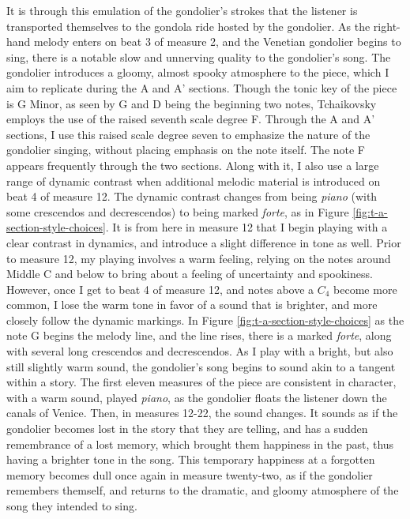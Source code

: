 It is through this emulation of the gondolier's strokes that the listener is transported themselves to the gondola ride hosted by the gondolier. As the right-hand melody enters on beat 3 of measure 2, and the Venetian gondolier begins to sing, there is a notable slow and unnerving quality to the gondolier's song. The gondolier introduces a gloomy, almost spooky atmosphere to the piece, which I aim to replicate during the A and A' sections. Though the tonic key of the piece is G Minor, as seen by G and D being the beginning two notes, Tchaikovsky employs the use of the raised seventh scale degree F\musSharp{}. Through the A and A' sections, I use this raised scale degree seven to emphasize the nature of the gondolier singing, without placing emphasis on the note itself. The note F\musSharp{} appears frequently through the two sections. Along with it, I also use a large range of dynamic contrast when additional melodic material is introduced on beat 4 of measure 12. The dynamic contrast changes from being \textit{piano} (with some crescendos and decrescendos) to being marked \textit{forte}, as in Figure \ref{fig:t-a-section-style-choices}\autocite{Henle_2002}. It is from here in measure 12 that I begin playing with a clear contrast in dynamics, and introduce a slight difference in tone as well. Prior to measure 12, my playing involves a warm feeling, relying on the notes around Middle C and below to bring about a feeling of uncertainty and spookiness. However, once I get to beat 4 of measure 12, and notes above a $C_4$ become more common, I lose the warm tone in favor of a sound that is brighter, and more closely follow the dynamic markings. In Figure \ref{fig:t-a-section-style-choices}\autocite{Henle_2002} as the note G begins the melody line, and the line rises, there is a marked \textit{forte}, along with several long crescendos and decrescendos. As I play with a bright, but also still slightly warm sound, the gondolier's song begins to sound akin to a tangent within a story. The first eleven measures of the piece are consistent in character, with a warm sound, played \textit{piano}, as the gondolier floats the listener down the canals of Venice. Then, in measures 12-22, the sound changes. It sounds as if the gondolier becomes lost in the story that they are telling, and has a sudden remembrance of a lost memory, which brought them happiness in the past, thus having a brighter tone in the song. This temporary happiness at a forgotten memory becomes dull once again in measure twenty-two, as if the gondolier remembers themself, and returns to the dramatic, and gloomy atmosphere of the song they intended to sing.

